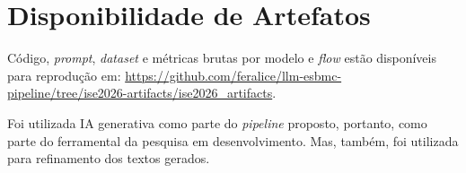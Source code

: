 \documentclass[sigconf]{acmart}
\begin{document}


\section*{Disponibilidade de Artefatos}
\label{sec:artefatos}

Código, \textit{prompt}, \textit{dataset} e métricas brutas por modelo e \textit{flow} estão disponíveis para reprodução em: \url{https://github.com/feralice/llm-esbmc-pipeline/tree/ise2026-artifacts/ise2026_artifacts}.



{\small Foi utilizada IA generativa como parte do \textit{pipeline} proposto, portanto, como parte do ferramental da pesquisa em desenvolvimento. Mas, também, foi utilizada para refinamento dos textos gerados.\par}





\end{document}
